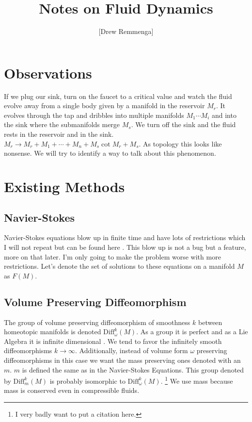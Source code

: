 \documentclass[10pt, oneside]{article}
\title{Notes on Fluid Dynamics}
\author{[Drew Remmenga]}
\begin{document}
\maketitle
\begin{abstract}
\end{abstract}
\section*{Observations}
   If we plug our sink, turn on the faucet to a critical value and watch the fluid evolve away from a single body given by a manifold in the reservoir $M_r$. It evolves through the tap and dribbles into multiple manifolds $M_1 \cdots M_i$ and into the sink where the submanifolds merge $M_s$.
   We turn off the sink and the fluid rests in the reservoir and in the sink. $M_r \to M_r + M_1 + \cdots + M_n + M_s \cot M_r + M_s$. As topology this looks like nonsense. We will try to identify a way to talk about this phenomenon.
\section*{Existing Methods}
\subsection*{Navier-Stokes}
   Navier-Stokes equations blow up in finite time \cite{tao2015finitetimeblowupaveraged} and have lots of restrictions which I will not repeat but can be found here \cite{tao2015finitetimeblowupaveraged}. This blow up is not a bug but a feature, more on that later.
   I'm only going to make the problem worse with more restrictions. Let's denote the set of solutions to these equations on a manifold $M$ as $F(M)$.
\subsection*{Volume Preserving Diffeomorphism}
   The group of volume preserving diffeomorphism of smoothness $k$ between homeotopic manifolds is denoted $\text{Diff}^k_\omega(M)$. As a group it is perfect and as a Lie Algebra it is infinite dimensional \cite{Banyaga1997}. We tend to favor the infinitely smooth diffeomorphisms $k \to \infty$.
   Additionally, instead of volume form $\omega$ preserving diffeomorphisms in this case we want the mass preserving ones denoted with an $m$. $m$ is defined the same as in the Navier-Stokes Equations. This group denoted by $\text{Diff}^k_m(M)$ is probably isomorphic to $\text{Diff}^k_\omega(M)$. \footnote{I very badly want to put a citation here.}
   We use mass because mass is conserved even in compressible fluids.
\end{document}
